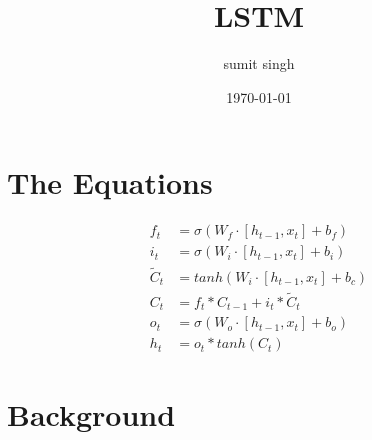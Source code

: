 \documentclass{article}
\title{LSTM}
\author{sumit singh}
\date{\today}
\begin{document}
\maketitle
\section{The Equations}
\begin{align*}
    f_t &= \sigma (W_f \cdot [h_{t-1},x_t] + b_f ) \\
    i_t &= \sigma (W_i \cdot [h_{t-1},x_t] + b_i ) \\
    \tilde{C}_t &= tanh(W_i \cdot [h_{t-1},x_t] + b_c) \\
    C_t &= f_t \ast C_{t-1} + i_t \ast \tilde{C}_t \\
    o_t &= \sigma(W_o \cdot[h_{t-1}, x_t] + b_o ) \\
    h_t &= o_t \ast tanh(C_t)
\end{align*}

\section{Background}
\end{document}
